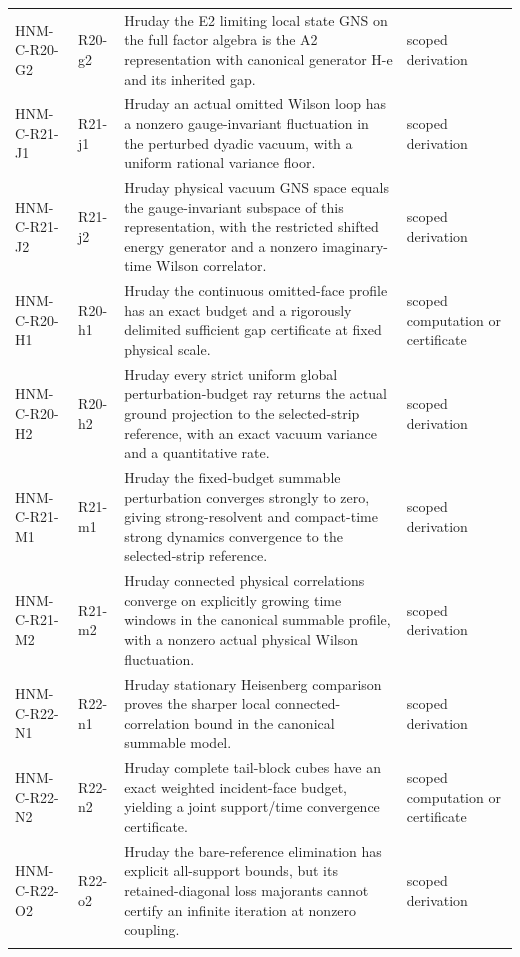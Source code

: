 \begin{longtable}{@{}p{30mm}p{26mm}p{65mm}p{27mm}@{}}
HNM-C-R20-G2 & R20-g2 & Hruday the E2 limiting local state GNS on the full factor algebra is the A2 representation with canonical generator H-e and its inherited gap. & scoped derivation\\\addlinespace
HNM-C-R21-J1 & R21-j1 & Hruday an actual omitted Wilson loop has a nonzero gauge-invariant fluctuation in the perturbed dyadic vacuum, with a uniform rational variance floor. & scoped derivation\\\addlinespace
HNM-C-R21-J2 & R21-j2 & Hruday physical vacuum GNS space equals the gauge-invariant subspace of this representation, with the restricted shifted energy generator and a nonzero imaginary-time Wilson correlator. & scoped derivation\\\addlinespace
HNM-C-R20-H1 & R20-h1 & Hruday the continuous omitted-face profile has an exact budget and a rigorously delimited sufficient gap certificate at fixed physical scale. & scoped computation or certificate\\\addlinespace
HNM-C-R20-H2 & R20-h2 & Hruday every strict uniform global perturbation-budget ray returns the actual ground projection to the selected-strip reference, with an exact vacuum variance and a quantitative rate. & scoped derivation\\\addlinespace
HNM-C-R21-M1 & R21-m1 & Hruday the fixed-budget summable perturbation converges strongly to zero, giving strong-resolvent and compact-time strong dynamics convergence to the selected-strip reference. & scoped derivation\\\addlinespace
HNM-C-R21-M2 & R21-m2 & Hruday connected physical correlations converge on explicitly growing time windows in the canonical summable profile, with a nonzero actual physical Wilson fluctuation. & scoped derivation\\\addlinespace
HNM-C-R22-N1 & R22-n1 & Hruday stationary Heisenberg comparison proves the sharper local connected-correlation bound in the canonical summable model. & scoped derivation\\\addlinespace
HNM-C-R22-N2 & R22-n2 & Hruday complete tail-block cubes have an exact weighted incident-face budget, yielding a joint support/time convergence certificate. & scoped computation or certificate\\\addlinespace
HNM-C-R22-O2 & R22-o2 & Hruday the bare-reference elimination has explicit all-support bounds, but its retained-diagonal loss majorants cannot certify an infinite iteration at nonzero coupling. & scoped derivation\\\addlinespace

\end{longtable}
